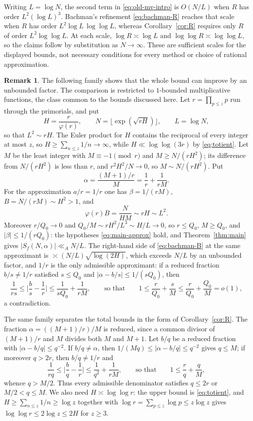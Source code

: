 \documentclass[11pt]{amsart}
\numberwithin{equation}{section}
\numberwithin{figure}{section}
\theoremstyle{definition}
\newtheorem{remark}{Remark}[section]
\begin{document}
Writing $L=\log N$, the second term in \eqref{eq:old-mv-intro} is
$O(N/L)$ when $R$ has order $L^2(\log L)^3$. Bachman's refinement
\eqref{eq:bachman-R} reaches that scale when $R$ has order
$L^2\log L\,\log\log L$, whereas Corollary~\ref{cor:R} requires only
$R$ of order $L^2\log\log L$. At each scale,
$\log R\asymp\log L$ and $\log\log R\asymp\log\log L$, so the claims
follow by substitution as $N\to\infty$. These are sufficient scales
for the displayed bounds, not necessary conditions for every method
or choice of rational approximation.

\begin{remark}\label{rem:comparison}
The following family shows that the whole bound can improve by an
unbounded factor. The comparison is restricted to $1$-bounded
multiplicative functions,
the class common to the bounds discussed here. Let $r=\prod_{p\le z}p$
run through the primorials, and put
\[
 H=\frac r{\varphi(r)},\qquad N=\lfloor\exp(\sqrt{rH})\rfloor,\qquad
 L=\log N,
\]
so that $L^2\sim rH$. The Euler product for $H$ contains the reciprocal
of every integer at most $z$, so $H\ge\sum_{n\le z}1/n\to\infty$, while
$H\ll\log\log(3r)$ by \eqref{eq:totient}. Let $M$ be the least integer
with $M\equiv-1\pmod r$ and $M\ge N/(rH^2)$; its difference from
$N/(rH^2)$ is less than $r$, and $r^2H^2/N\to0$, so $M\sim N/(rH^2)$.
Put
\[
 \alpha=\frac{(M+1)/r}M=\frac1r+\frac1{rM}.
\]
For the approximation $a/r=1/r$ one has $\beta=1/(rM)$,
$B=N/(rM)\sim H^2>1$, and
\[
 \varphi(r)B=\frac N{HM}\sim rH\sim L^2.
\]
Moreover $r/Q_0\to0$ and $Q_0/M\sim rH^2/L^3\sim H/L\to0$, so
$r\le Q_0$, $M\ge Q_0$, and $|\beta|\le1/(rQ_0)$: the hypotheses
\eqref{eq:main-approx} hold, and Theorem~\ref{thm:main} gives
$|S_f(N,\alpha)|\ll_A N/L$. The right-hand side of
\eqref{eq:bachman-B} at the same approximant is
$\asymp(N/L)\sqrt{\log(2H)}$, which exceeds $N/L$ by an unbounded
factor, and $1/r$ is the only admissible approximant: if a reduced
fraction $b/s\ne1/r$ satisfied $s\le Q_0$ and $|\alpha-b/s|\le1/(sQ_0)$,
then
\[
 \frac1{rs}\le\bigg|\frac bs-\frac1r\bigg|\le\frac1{sQ_0}+\frac1{rM},
 \qquad\text{so that}\qquad
 1\le\frac r{Q_0}+\frac sM\le\frac r{Q_0}+\frac{Q_0}M=o(1),
\]
a contradiction.

The same family separates the total bounds in the form of
Corollary~\ref{cor:R}. The fraction $\alpha=((M+1)/r)/M$ is reduced,
since a common divisor of $(M+1)/r$ and $M$ divides both $M$ and
$M+1$. Let $b/q$ be a reduced fraction with $|\alpha-b/q|\le q^{-2}$.
If $b/q\ne\alpha$, then $1/(Mq)\le|\alpha-b/q|\le q^{-2}$ gives
$q\le M$; if moreover $q>2r$, then $b/q\ne1/r$ and
\[
 \frac1{rq}\le\bigg|\frac bq-\frac1r\bigg|\le\frac1{q^2}+\frac1{rM},
 \qquad\text{so that}\qquad 1\le\frac rq+\frac qM,
\]
whence $q>M/2$. Thus every admissible denominator satisfies $q\le2r$
or $M/2<q\le M$. We also need $H\asymp\log\log r$: the upper bound is
\eqref{eq:totient}, and $H\ge\sum_{n\le z}1/n\ge\log z$ together with
$\log r=\sum_{p\le z}\log p\le z\log z$ gives
$\log\log r\le2\log z\le2H$ for $z\ge3$.


\end{remark}
\end{document}
